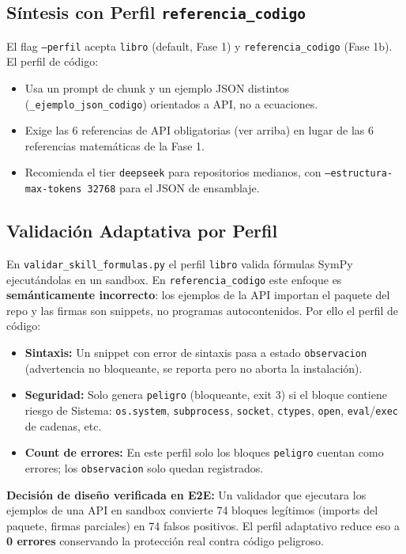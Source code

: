 \documentclass[11pt,a4paper]{article}
\begin{document}
\subsection{Síntesis con Perfil \texttt{referencia\_codigo}}
El flag \texttt{--perfil} acepta \texttt{libro} (default, Fase 1) y \texttt{referencia\_codigo} (Fase 1b). El perfil de código:
\begin{itemize}[leftmargin=*]
  \item Usa un prompt de chunk y un ejemplo JSON distintos (\texttt{\_ejemplo\_json\_codigo}) orientados a API, no a ecuaciones.
  \item Exige las 6 referencias de API obligatorias (ver arriba) en lugar de las 6 referencias matemáticas de la Fase 1.
  \item Recomienda el tier \texttt{deepseek} para repositorios medianos, con \texttt{--estructura-max-tokens 32768} para el JSON de ensamblaje.
\end{itemize}

\subsection{Validación Adaptativa por Perfil}
En \texttt{validar\_skill\_formulas.py} el perfil \texttt{libro} valida fórmulas SymPy ejecutándolas en un sandbox. En \texttt{referencia\_codigo} este enfoque es \textbf{semánticamente incorrecto}: los ejemplos de la API importan el paquete del repo y las firmas son snippets, no programas autocontenidos. Por ello el perfil de código:
\begin{itemize}[leftmargin=*]
  \item \textbf{Sintaxis:} Un snippet con error de sintaxis pasa a estado \texttt{observacion} (advertencia no bloqueante, se reporta pero no aborta la instalación).
  \item \textbf{Seguridad:} Solo genera \texttt{peligro} (bloqueante, exit 3) si el bloque contiene riesgo de Sistema: \texttt{os.system}, \texttt{subprocess}, \texttt{socket}, \texttt{ctypes}, \texttt{open}, \texttt{eval}/\texttt{exec} de cadenas, etc.
  \item \textbf{Count de errores:} En este perfil solo los bloques \texttt{peligro} cuentan como errores; los \texttt{observacion} solo quedan registrados.
\end{itemize}

\begin{cajaAlerta}
\textbf{Decisión de diseño verificada en E2E:} Un validador que ejecutara los ejemplos de una API en sandbox convierte 74 bloques legítimos (imports del paquete, firmas parciales) en 74 falsos positivos. El perfil adaptativo reduce eso a \textbf{0 errores} conservando la protección real contra código peligroso.
\end{cajaAlerta}
\end{document}
